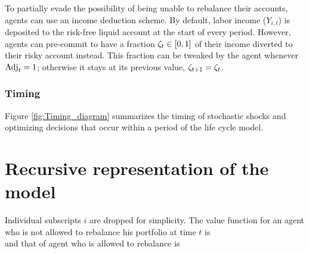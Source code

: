 \documentclass[./RiskyContrib.tex]{subfiles}
\begin{document}
To partially evade the possibility of being unable to rebalance their accounts, agents
can use an income deduction scheme. By default, labor income ($Y_{i,t}$) is deposited to
the risk-free liquid account at the start of every period. However, agents can pre-commit
to have a fraction  $\zeta_t\in[0,1]$ of their income diverted to their risky account instead.
This fraction can be tweaked by the agent whenever $\text{Adj}_t = 1$; otherwise it stays at its
previous value, $\zeta_{t+1} = \zeta_t$.

\subsubsection{Timing}



Figure \ref{fig:Timing_diagram} summarizes the timing of stochastic shocks and
optimizing decisions that occur within a period of the life cycle model.

\hypertarget{Recursive}{}
\section{Recursive representation of the model}\label{sec:recursive}

Individual subscripts $i$ are dropped for simplicity. The value function for
an agent who is not allowed to rebalance his portfolio at time $t$ is
\begin{equation*}
    
\end{equation*}
and that of agent who is allowed to rebalance is
\begin{equation*}
    
\end{equation*}
\end{document}
